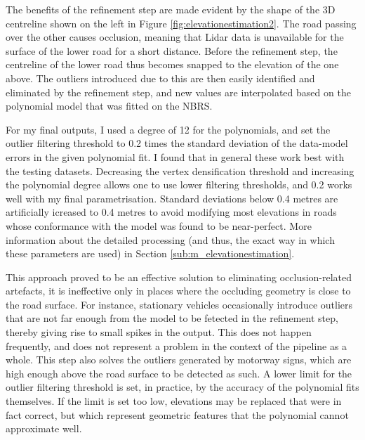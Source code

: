 The benefits of the refinement step are made evident by the shape of the 3D centreline shown on the left in Figure \ref{fig:elevationestimation2}. The road passing over the other causes occlusion, meaning that Lidar data is unavailable for the surface of the lower road for a short distance. Before the refinement step, the centreline of the lower road thus becomes snapped to the elevation of the one above. The outliers introduced due to this are then easily identified and eliminated by the refinement step, and new values are interpolated based on the polynomial model that was fitted on the NBRS.

For my final outputs, I used a degree of 12 for the polynomials, and set the outlier filtering threshold to 0.2 times the standard deviation of the data-model errors in the given polynomial fit. I found that in general these work best with the testing datasets. Decreasing the vertex densification threshold and increasing the polynomial degree allows one to use lower filtering thresholds, and 0.2 works well with my final parametrisation. Standard deviations below 0.4 metres are artificially icreased to 0.4 metres to avoid modifying most elevations in roads whose conformance with the model was found to be near-perfect. More information about the detailed processing (and thus, the exact way in which these parameters are used) in Section \ref{sub:m_elevationestimation}.

This approach proved to be an effective solution to eliminating occlusion-related artefacts, it is ineffective only in places where the occluding geometry is close to the road surface. For instance, stationary vehicles occasionally introduce outliers that are not far enough from the model to be fetected in the refinement step, thereby giving rise to small spikes in the output. This does not happen frequently, and does not represent a problem in the context of the pipeline as a whole. This step also solves the outliers generated by motorway signs, which are high enough above the road surface to be detected as such. A lower limit for the outlier filtering threshold is set, in practice, by the accuracy of the polynomial fits themselves. If the limit is set too low, elevations may be replaced that were in fact correct, but which represent geometric features that the polynomial cannot approximate well.

